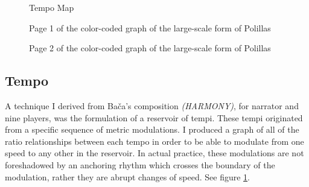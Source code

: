 \begin{figure}[p]
{{
}
}
    \caption{Tempo Map}
    \label{fig:apolillas-tempo}
\end{figure}

\begin{figure}[p]
\centering
    \caption{Page 1 of the color-coded graph of the large-scale form of Polillas}
    \label{fig:Polillas-graph-1}
\end{figure}

\begin{figure}[p]
\centering
    \caption{Page 2 of the color-coded graph of the large-scale form of Polillas}
    \label{fig:Polillas-graph-2}
\end{figure}

\subsection{Tempo}

A technique I derived from Bača's composition \textit{(HARMONY)}, for narrator and nine players, was the formulation of a reservoir of tempi. These tempi originated from a specific sequence of metric modulations. I produced a graph of all of the ratio relationships between each tempo in order to be able to modulate from one speed to any other in the reservoir. In actual practice, these modulations are not foreshadowed by an anchoring rhythm which crosses the boundary of the modulation, rather they are abrupt changes of speed. See figure \ref{fig:apolillas-tempo}.


